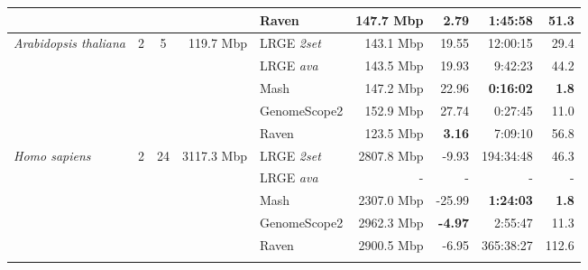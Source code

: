 \documentclass[unnumsec,webpdf,modern,large]{oup-authoring-template}
\theoremstyle{thmstyleone}%
\theoremstyle{thmstyletwo}%
\theoremstyle{thmstylethree}%
\newcommand{\lrge}{LRGE}
\newcommand{\ava}{\textit{ava}}
\newcommand{\twoset}{\textit{2set}}
\begin{document}
\begin{table}[t]
\begin{tabular*}{\textwidth}{@{}lccrlrrrr@{}}
                                                   &                    &                     &                              & Raven             & 147.7 Mbp & 2.79          & 1:45:58 & 51.3             \\ \midrule
\multirow{5}{*}{\textit{Arabidopsis thaliana}}     & \multirow{5}{*}{2} & \multirow{5}{*}{5}  & \multirow{5}{*}{119.7 Mbp} & \lrge{} \twoset{}   & 143.1 Mbp & 19.55          & 12:00:15  & 29.4              \\
                                                   &                    &                     &                              & \lrge{} \ava{}    & 143.5 Mbp & 19.93          & 9:42:23  & 44.2              \\
                                                   &                    &                     &                              & Mash              & 147.2 Mbp & 22.96         & \textbf{0:16:02}  & \textbf{1.8}              \\
                                                   &                    &                     &                              & GenomeScope2      & 152.9 Mbp & 27.74          & 0:27:45  & 11.0             \\
                                                   &                    &                     &                              & Raven             & 123.5 Mbp & \textbf{3.16}          & 7:09:10 & 56.8             \\ \midrule
\multirow{5}{*}{\textit{Homo sapiens}}     & \multirow{5}{*}{2} & \multirow{5}{*}{24}  & \multirow{5}{*}{3117.3 Mbp} & \lrge{} \twoset{}   & 2807.8 Mbp & -9.93          & 194:34:48  & 46.3              \\
                                                   &                    &                     &                              & \lrge{} \ava{}    & - & -          & -  & -              \\
                                                   &                    &                     &                              & Mash              & 2307.0 Mbp & -25.99         & \textbf{1:24:03}  & \textbf{1.8}              \\
                                                   &                    &                     &                              & GenomeScope2      & 2962.3 Mbp & \textbf{-4.97}          & 2:55:47  & 11.3             \\
                                                   &                    &                     &                              & Raven             & 2900.5 Mbp & -6.95          & 365:38:27 & 112.6             \\ \botrule

\end{tabular*}
\end{table}
\end{document}
